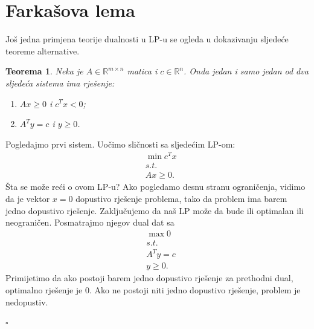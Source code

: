 \documentclass[a4paper, utf8, 11pt, colorlinks]{book}
\newtheorem{thm}{Teorema}
\newenvironment{proof}{{Dokaz:}}{\hfill$\square$}
\begin{document}
\section{Farkašova lema}
Još jedna primjena teorije dualnosti u LP-u se ogleda u dokazivanju sljedeće teoreme alternative.

\begin{thm}
	Neka je $A\in \mathbb{R}^{m \times n}$ matica i $c\in \mathbb{R}^n$. Onda jedan i samo jedan od dva sljedeća sistema ima rješenje:
	\begin{enumerate}
		\item  $Ax \geq 0$  i $c^T x < 0$; \label{case:1}
		\item $A^T y = c$ i $y \geq 0$. \label{case:2}
	\end{enumerate}
\end{thm}
\begin{proof}
	  Pogledajmo prvi sistem. Uočimo sličnosti sa   sljedećim LP-om:
	  \begin{align*}
	  	 &\min c^T x \\
	  	 &s.t. \\
	  	 & A x \geq 0.
	  \end{align*}
  Šta se može reći o ovom LP-u? Ako pogledamo desnu stranu ograničenja, vidimo da je vektor $x = 0$ 
  dopustivo rješenje problema, tako da problem ima barem jedno dopustivo rješenje. Zaključujemo da naš LP može da bude ili optimalan ili neograničen. Posmatrajmo njegov dual   dat sa 
  \begin{align*}
  	   &\max 0 \\
  	   &s.t. \\
  	   & A^T y  = c \\
  	   & y \geq 0.
  \end{align*}
  Primijetimo da ako postoji barem jedno dopustivo rješenje za prethodni dual, optimalno rješenje je 0. Ako ne postoji niti jedno dopustivo rješenje, problem je nedopustiv. 
  

\end{proof}
\end{document}

